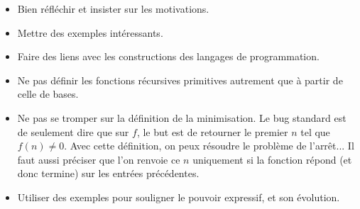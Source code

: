 \documentclass{agregfiche}
\begin{document}
\secpieges

\begin{itemize}
    \item Bien réfléchir et insister sur les motivations.
    \item Mettre des exemples intéressants.
    \item Faire des liens avec les constructions des langages de programmation.
    \item Ne pas définir les fonctions récursives primitives autrement que à partir de celle de bases.
    \item Ne pas se tromper sur la définition de la minimisation. Le bug standard est de seulement dire que sur $f$, le but est de retourner le premier $n$ tel que $f(n) \neq 0$. Avec cette définition, on peux résoudre le problème de l'arrêt... Il faut aussi préciser que l'on renvoie ce $n$ uniquement si la fonction répond (et donc termine) sur les entrées précédentes.
    \item Utiliser des exemples pour souligner le pouvoir expressif, et son évolution.
\end{itemize}

\secquestionsclassiques
\end{document}
